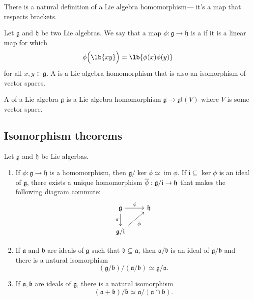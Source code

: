 \documentclass{article}
\DeclarePairedDelimiter\lb\lbrack\rbrack
\DeclareMathOperator{\im}{im}
\newcommand*\frka{{\ensuremath{\mathfrak{a}}}}
\newcommand*\frkb{{\ensuremath{\mathfrak{b}}}}
\newcommand*\frkg{{\ensuremath{\mathfrak{g}}}}
\newcommand*\frkh{{\ensuremath{\mathfrak{h}}}}
\newcommand*\frki{{\ensuremath{\mathfrak{i}}}}
\newcommand*\glalg{\ensuremath{\mathfrak{gl}}}
\begin{document}
There is a natural definition of a Lie algebra homomorphism--- it's a map that respects brackets.

\begin{definition}
    \label{def:LieAlgHom}
    Let $\frkg$ and $\frkh$ be two Lie algebras.
    We say that a map $\phi: \frkg \to \frkh$ is a  if it is a linear map for which
    \[
        \phi\Big(\lb{xy}\Big)
        =
        \lb{\phi(x)\phi(y)}
    \]
    for all $x,y \in \frkg$. 
    A  is a Lie algebra homomorphism that is also an isomorphism of vector spaces.
\end{definition}


\begin{definition}
    A  of a Lie algebra $\frkg$ is a Lie algebra homomorphism $\frkg \to \glalg(V)$ where $V$ is some vector space.
\end{definition}

\subsection{Isomorphism theorems}

\begin{theorem}
    Let $\frkg$ and $\frkh$ be Lie algerbas.
    \begin{enumerate}[label=(\alph*)]
        \item \label{thm:FirstIsomorphismThm}
            If $\phi: \frkg \to \frkh$ is a homomorphism, then $\frkg / \ker \phi \simeq \im \phi$.
            If $\frki \subseteq \ker \phi$ is an ideal of $\frkg$, there exists a unique homomorphism $\barphi: \frkg/\frki \to \frkh$ that makes the following diagram commute:
            \[
                \begin{tikzcd}
                    \frkg \arrow[r, "\phi"] \arrow[d, "\pi"'] & \frkh \\ 
                                                             \frkg/\frki \arrow[ur, "\barphi"']
                \end{tikzcd}
            \]
        \item 
            If $\frka$ and $\frkb$ are ideals of $\frkg$ such that $\frkb \subseteq \frka$, then $\frka/\frkb$ is an ideal of $\frkg/\frkb$ and there is a natural isomorphism
            \[
                (\frkg/\frkb)/(\frka/\frkb)
                \simeq
                \frkg/\frka.
            \]
        \item 
            If $\frka, \frkb$ are ideals of $\frkg$, there is a natural isomorphism
            \[
                (\frka + \frkb)/\frkb
                \simeq
                \frka/(\frka \cap \frkb).
            \]
    \end{enumerate}
\end{theorem}
\end{document}
